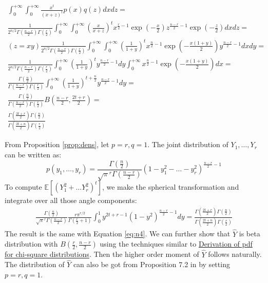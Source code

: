 \documentclass{article}
\def\E{\mathbb{E}}
\begin{document}
\begin{align*}
\int_{0}^{+\infty}\int_{0}^{+\infty} \frac{x^t}{(x+z)^t} p(x)q(z) dxdz =
& \\ \frac{1}{2^{n/2} \Gamma(\frac{n-r}{2})\Gamma(\frac{r}{2})}
\int_{0}^{+\infty}\int_{0}^{+\infty}
\left(\frac{x}{x+z}\right)^t
x^{\frac{r}{2}-1}\exp(-\frac{x}{2})
z^{\frac{n-r}{2}-1}\exp(-\frac{z}{2})dxdz =
& \\ (z=xy) \frac{1}{2^{n/2}\Gamma(\frac{n-r}{2})\Gamma(\frac{r}{2})}
\int_{0}^{+\infty}\int_{0}^{+\infty}
\left(\frac{1}{1+y}\right)^t
x^{\frac{n}{2}-1}\exp(-\frac{x(1+y)}{2})y^{\frac{n-r}{2}-1}dxdy =
& \\  \frac{1}{2^{n/2} \Gamma(\frac{n-r}{2})\Gamma(\frac{r}{2})}
\int_{0}^{+\infty}\left(\frac{1}{1+y}\right)^t
y^{\frac{n-r}{2}-1} dy
\int_{0}^{+\infty} x^{\frac{n}{2}-1}\exp(-\frac{x(1+y)}{2})dx = & \\
\frac{\Gamma(\frac{n}{2})}{\Gamma(\frac{n-r}{2})\Gamma(\frac{r}{2})}
\int_{0}^{+\infty}\left(\frac{1}{1+y}\right)^{t+\frac{n}{2}}
y^{\frac{n-r}{2}-1} dy =
& \\  \frac{\Gamma(\frac{n}{2})}{\Gamma(\frac{n-r}{2})\Gamma(\frac{r}{2})}
B(\frac{n-r}{2}, \frac{2t+r}{2}) =
& \\ \frac{\Gamma(\frac{2t+r}{2})\Gamma(\frac{n}{2})}
{\Gamma(\frac{2t+n}{2})\Gamma(\frac{r}{2})}
\end{align*}

From Proposition \ref{prop:dens}, let $p=r, q=1$.
The joint distribution of $Y_1, \dots, Y_r$ can be written as:
$$
p(y_1, \dots, y_r) = \frac{\Gamma(\frac{n}{2})}{\sqrt{\pi}^r
\Gamma(\frac{n-r}{2})}(1- y_1^2 - \dots - y_r^2)^{\frac{n-r}{2} -1}
$$
To compute $\E[(Y_1^2 + \dots Y_r^2)^t]$, we
make the spherical transformation and
integrate over all those angle components:
\begin{align*}
\frac{\Gamma(\frac{n}{2})}{\sqrt{\pi}^r\Gamma(\frac{n-r}{2})}
\frac{r\pi^{r/2}}{\Gamma(\frac{r}{2}+1)}
\int_{0}^1 y^{2t+r-1}(1- y^2)^{\frac{n-r}{2} -1} dy =
\frac{\Gamma(\frac{2t+r}{2})\Gamma(\frac{n}{2})}
{\Gamma(\frac{2t+n}{2})\Gamma(\frac{r}{2})}
\end{align*}
The result is the same with Equation \eqref{eq:n4}.
We can further show that $\hat{Y}$
is beta distribution with $B(\frac{r}{2}, \frac{n-r}{2})$
using the techniques similar to
\href{https://en.wikipedia.org/wiki/
Proofs_related_to_chi-squared_distribution
#Derivation_of_the_pdf_for_k_degrees_of_freedom}
{Derivation of pdf for chi-square distributions}.
Then the higher order moment of $\hat{Y}$ follows naturally.
The distribution of $\hat{Y}$ can also be got
from Proposition 7.2 in \cite{eaton1989group} by setting $p=r, q=1$.
\end{document}
